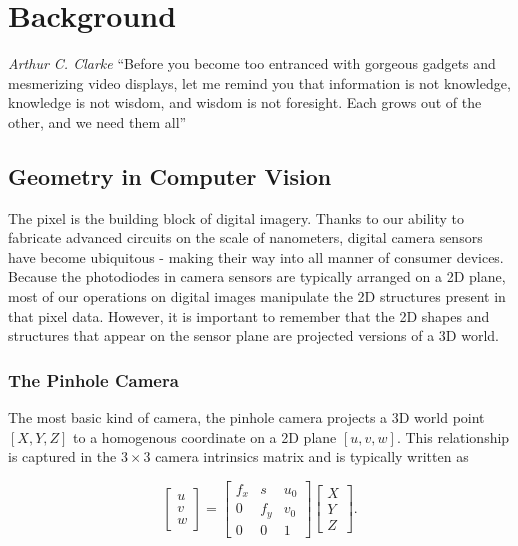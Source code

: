
\chapter{Background}

\begin{chapquote}{\textit{Arthur C. Clarke}}
    ``Before you become too entranced with gorgeous gadgets and mesmerizing video displays, let me remind you that information is not knowledge, knowledge is not wisdom, and wisdom is not foresight. Each grows out of the other, and we need them all''
\end{chapquote}

\section{Geometry in Computer Vision}

The pixel is the building block of digital imagery. Thanks to our ability to fabricate advanced circuits on the scale of nanometers, digital camera sensors have become ubiquitous - making their way into all manner of consumer devices. Because the photodiodes in camera sensors are typically arranged on a 2D plane, most of our operations on digital images manipulate the 2D structures present in that pixel data. However, it is important to remember that the 2D shapes and structures that appear on the sensor plane are projected versions of a 3D world. 

\subsection{The Pinhole Camera}

The most basic kind of camera, the pinhole camera projects a 3D world point $[X, Y, Z]$ to a homogenous coordinate on a 2D plane $[u, v, w]$. This relationship is captured in the $3 \times 3$ camera intrinsics matrix and is typically written as 

\begin{equation}
\begin{bmatrix}
    u\\
    v\\
    w
\end{bmatrix} = 
\begin{bmatrix}
    f_x & s & u_0 \\ 
    0 & f_y  & v_0 \\ 
    0 & 0 & 1 
\end{bmatrix}
\begin{bmatrix}
    X \\
    Y \\
    Z
\end{bmatrix}.
\end{equation}

